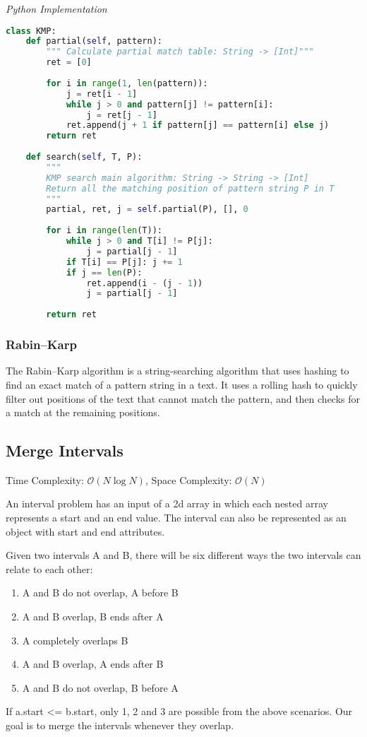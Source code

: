 \documentclass{article}
\newcommand{\bigO}{\ensuremath{\mathcal{O}}}
\begin{document}
\vspace{8pt} \emph{Python Implementation}
\begin{lstlisting}[language=Python]    
class KMP:
    def partial(self, pattern):
        """ Calculate partial match table: String -> [Int]"""
        ret = [0]
        
        for i in range(1, len(pattern)):
            j = ret[i - 1]
            while j > 0 and pattern[j] != pattern[i]:
                j = ret[j - 1]
            ret.append(j + 1 if pattern[j] == pattern[i] else j)
        return ret
        
    def search(self, T, P):
        """ 
        KMP search main algorithm: String -> String -> [Int] 
        Return all the matching position of pattern string P in T
        """
        partial, ret, j = self.partial(P), [], 0
        
        for i in range(len(T)):
            while j > 0 and T[i] != P[j]:
                j = partial[j - 1]
            if T[i] == P[j]: j += 1
            if j == len(P): 
                ret.append(i - (j - 1))
                j = partial[j - 1]
            
        return ret
\end{lstlisting}
    
    \subsubsection{Rabin–Karp}
    The Rabin–Karp algorithm is a string-searching algorithm that uses hashing to find an exact match of a pattern string in a text. It uses a rolling hash to quickly filter out positions of the text that cannot match the pattern, and then checks for a match at the remaining positions.
    
    \subsection{Merge Intervals}
    Time Complexity: $\bigO(N \log N)$, Space Complexity: $\bigO(N)$
    
    An interval problem has an input of a 2d array in which each nested array represents a start and an end value. The interval can also be represented as an object with start and end attributes.
    
    Given two intervals A and B, there will be six different ways the two intervals can relate to each other:
    \begin{enumerate}
        \item A and B do not overlap, A before B
        \item A and B overlap, B ends after A
        \item A completely overlaps B
        \item A and B overlap, A ends after B
        \item  A and B do not overlap, B before A
    \end{enumerate}
    If a.start <= b.start, only 1, 2 and 3 are possible from the above scenarios.  Our goal is to merge the intervals whenever they overlap.
    
\end{document}
